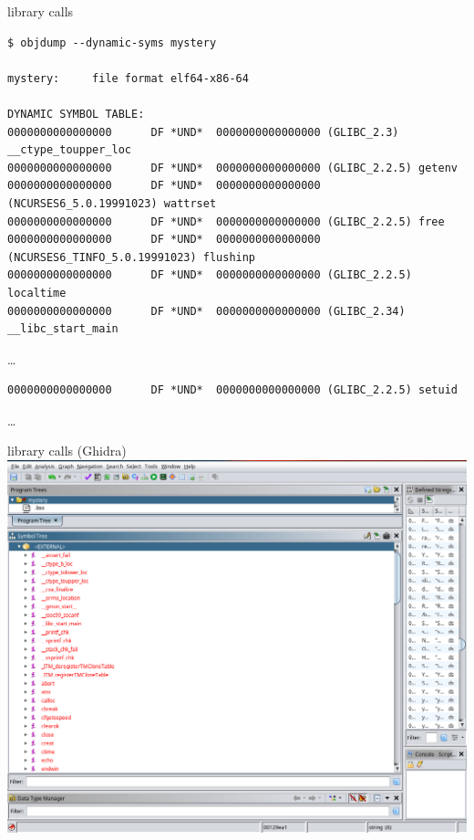 \begin{frame}[fragile]{library calls}
\begin{Verbatim}[fontsize=\fontsize{8}{9}]
$ objdump --dynamic-syms mystery

mystery:     file format elf64-x86-64

DYNAMIC SYMBOL TABLE:
0000000000000000      DF *UND*  0000000000000000 (GLIBC_2.3)  __ctype_toupper_loc
0000000000000000      DF *UND*  0000000000000000 (GLIBC_2.2.5) getenv
0000000000000000      DF *UND*  0000000000000000 (NCURSES6_5.0.19991023) wattrset
0000000000000000      DF *UND*  0000000000000000 (GLIBC_2.2.5) free
0000000000000000      DF *UND*  0000000000000000 (NCURSES6_TINFO_5.0.19991023) flushinp
0000000000000000      DF *UND*  0000000000000000 (GLIBC_2.2.5) localtime
0000000000000000      DF *UND*  0000000000000000 (GLIBC_2.34) __libc_start_main
\end{Verbatim}
\ldots
\begin{Verbatim}[fontsize=\fontsize{9}{10}]
0000000000000000      DF *UND*  0000000000000000 (GLIBC_2.2.5) setuid
\end{Verbatim}
\ldots
\end{frame}

\begin{frame}[fragile]{library calls (Ghidra)}
\includegraphics[width=\textwidth]{../re-tools/ghidra-mystery-ext}
\end{frame}

